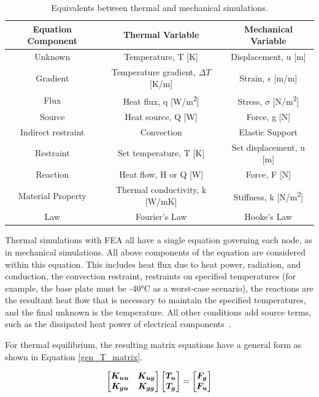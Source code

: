 \begin{table}[h]
\begin{center}
\begin{tabular}{ |c|c|c| }
 \hline
 \rowcolor{lightgray}
 Equation Component & Thermal Variable  & Mechanical Variable\\
  \hline
  Unknown & Temperature, T [K] & Displacement, u [m]\\
  \hline
 Gradient & Temperature gradient, $\Delta T$ [K/m] & Strain, $\epsilon$ [m/m]\\
 \hline
 Flux & Heat flux, q [W/m\textsuperscript{2}] & Stress, $\sigma$ [N/m\textsuperscript{2}]\\
 \hline
 Source & Heat source, Q [W] & Force, g [N]\\
 \hline
 Indirect restraint & Convection & Elastic Support \\
 \hline
 Restraint & Set temperature, T [K] & Set displacement, u [m]\\
 \hline
 Reaction & Heat flow, H or Q [W] & Force, F [N]\\
 \hline
 Material Property & Thermal conductivity, k [W/mK] & Stiffness, k [N/m\textsuperscript{2}]\\
 \hline
 Law & Fourier's Law & Hooke's Law\\
 \hline
\end{tabular}
\end{center}
\caption{Equivalents between thermal and mechanical simulations.}
 \label{mech_to_thermal_properties}
\end{table}

Thermal simulations with FEA all have a single equation governing each node, as in mechanical simulations. All above components of the equation are considered within this equation. This includes heat flux due to heat power, radiation, and conduction, the convection restraint, restraints on specified temperatures (for example, the base plate must be -40°C as a worst-case scenario), the reactions are the resultant heat flow that is necessary to maintain the specified temperatures, and the final unknown is the temperature. All other conditions add source terms, such as the dissipated heat power of electrical components~\citep{FEA_SW}.

For thermal equilibrium, the resulting matrix equations have a general form as shown in Equation \ref{gen_T_matrix}.

\begin{equation} \label{gen_T_matrix}
\begingroup \boldmath
    \begin{bmatrix}
        K_{uu} & K_{ug} \\
        K_{gu} & K_{gg}
    \end{bmatrix}
    \begin{bmatrix}
        T_u \\
        T_g \\
    \end{bmatrix}
    =
    \begin{bmatrix}
        F_g \\
        F_u \\
    \end{bmatrix}
\endgroup
\end{equation}

